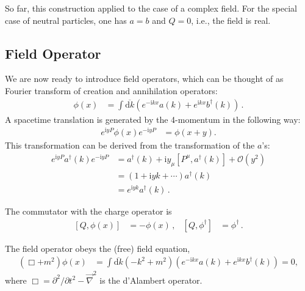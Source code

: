 \documentclass[12pt]{report}
\renewcommand{\d}{\text{d}}
\newcommand{\dkbar}{\ensuremath{\overline{\d k}}}
\renewcommand{\i}{\ensuremath{\text{i}}}
\newcommand{\2}{\ensuremath{\sqrt{2}\,}}
\renewcommand{\d}{\ensuremath{\text{d}}}
\begin{document}
{      So far, this construction applied to the case of a complex field. For the special case of 
      neutral particles, one has $a=b$ and $Q=0$, i.e., the field is real. 


      \subsection{Field Operator}
      We are now ready to introduce field operators, which can be thought of as Fourier transform
      of creation and annihilation operators:
      \begin{align}\label{eq:fieldoperator}
        \phi (x)&= \int \dkbar \left( e^{-\i kx} a(k) + e^{\i kx} b^\dagger (k)\right)\,.
      \end{align}
      A spacetime translation is generated by the 4-momentum in the following way:
      \begin{align}
        e^{\i y P} \phi(x) e^{-\i y P}&= \phi (x+y).
      \end{align}
      This transformation can be derived from the transformation of the $a$'s:
      \begin{align}
        e^{\i y P} a^\dagger(k) e^{-\i y P} &= a^\dagger(k) +\i y_\mu \left[P^\mu,a^\dagger(k)\right] +
        \mathcal{O}\left(y^2\right) \\
        &= \left(1+ \i y k +\dotsm\right) a^\dagger(k)\\
        &= e^{\i y k} a^\dagger(k)\,.
      \end{align}

      The commutator with the charge operator is
      \begin{align}
        \left[Q,\phi(x)\right] &= -\phi(x)\,, & \left[Q,\phi^\dagger\right]&= \phi^\dagger\,.
      \end{align}

      The field operator obeys the (free) field equation,
      \begin{align}
        \left(\Box +m^2\right)\phi(x)&= \int \dkbar \left( -k^2 +m^2\right)\left(e^{-\i kx}a (k)
          +e^{\i kx} b^\dagger(k)\right)=0,
      \end{align}
      where $\Box = \partial^2/\partial t^2 - \vec{\nabla}^2$ is the d'Alambert operator.

}
\end{document}
